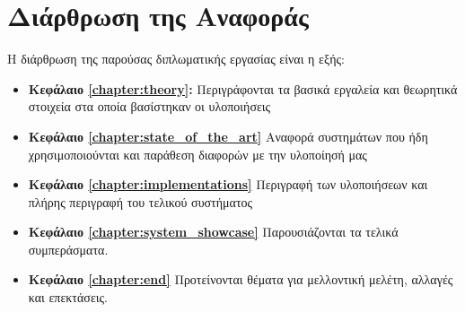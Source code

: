 \section{Διάρθρωση της Αναφοράς}
\label{section:layout}

Η διάρθρωση της παρούσας διπλωματικής εργασίας είναι η εξής:

\begin{itemize}
  \item{\textbf{Κεφάλαιο \ref{chapter:theory}:} 
		Περιγράφονται τα βασικά εργαλεία και θεωρητικά στοιχεία
		στα οποία βασίστηκαν οι υλοποιήσεις
    }
  \item{\textbf{Κεφάλαιο \ref{chapter:state_of_the_art}} Αναφορά συστημάτων που ήδη χρησιμοποιούνται	
		και παράθεση διαφορών με την υλοποίησή μας
    }
  \item{\textbf{Κεφάλαιο \ref{chapter:implementations}} Περιγραφή των υλοποιήσεων
  		και πλήρης περιγραφή του τελικού συστήματος
    }
  \item{\textbf{Κεφάλαιο \ref{chapter:system_showcase}} Παρουσιάζονται τα τελικά συμπεράσματα.
    }
  \item{\textbf{Κεφάλαιο \ref{chapter:end}} Προτείνονται θέματα για μελλοντική
      μελέτη, αλλαγές και επεκτάσεις.
    }
\end{itemize}
